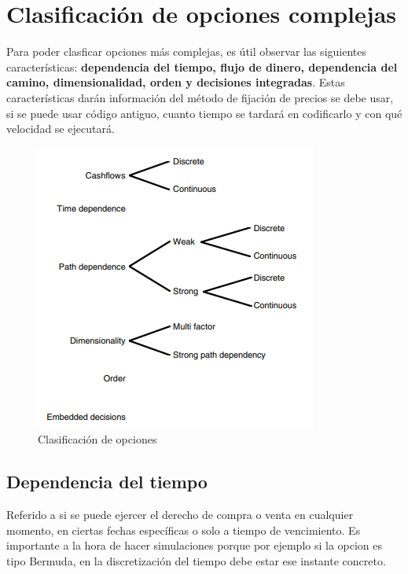 \section{Clasificación de opciones complejas}

Para poder clasficar opciones más complejas, es útil observar las siguientes características: \textbf{dependencia del tiempo, flujo de dinero, dependencia del camino, dimensionalidad, orden y decisiones integradas}. Estas características darán información del método de fijación de precios se debe usar, si se puede usar código antiguo, cuanto tiempo se tardará en codificarlo y con qué velocidad se ejecutará.
\begin{figure}[H]
    \centering
    \includegraphics[width=0.65\linewidth]{Imagenes/Parte2/17_Clas_exot_path_ops/Clasif_Opt.png}
    \caption{Clasificación de opciones}
\end{figure}



\subsection{Dependencia del tiempo}
Referido a si se puede ejercer el derecho de compra o venta en cualquier momento, en ciertas fechas específicas o solo a tiempo de vencimiento. Es importante a la hora de hacer simulaciones porque por ejemplo si la opcion es tipo Bermuda, en la discretización del tiempo debe estar ese instante concreto.


